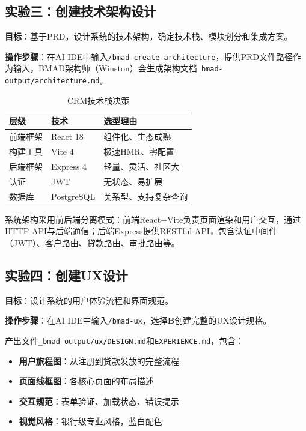\subsection{实验三：创建技术架构设计}

\textbf{目标}：基于PRD，设计系统的技术架构，确定技术栈、模块划分和集成方案。

\textbf{操作步骤}：在AI IDE中输入\texttt{/bmad-create-architecture}，提供PRD文件路径作为输入，BMAD架构师（Winston）会生成架构文档\texttt{\_bmad-output/architecture.md}。

\begin{table}[H]
\centering
\begin{tabular}{lll}
\toprule
\textbf{层级} & \textbf{技术} & \textbf{选型理由} \\
\midrule
前端框架 & React 18 & 组件化、生态成熟 \\
构建工具 & Vite 4 & 极速HMR、零配置 \\
后端框架 & Express 4 & 轻量、灵活、社区大 \\
认证 & JWT & 无状态、易扩展 \\
数据库 & PostgreSQL & 关系型、支持复杂查询 \\
\bottomrule
\end{tabular}
\caption{CRM技术栈决策}
\end{table}

系统架构采用前后端分离模式：前端React+Vite负责页面渲染和用户交互，通过HTTP API与后端通信；后端Express提供RESTful API，包含认证中间件（JWT）、客户路由、贷款路由、审批路由等。

\subsection{实验四：创建UX设计}

\textbf{目标}：设计系统的用户体验流程和界面规范。

\textbf{操作步骤}：在AI IDE中输入\texttt{/bmad-ux}，选择\textbf{B}创建完整的UX设计规格。

产出文件\texttt{\_bmad-output/ux/DESIGN.md}和\texttt{EXPERIENCE.md}，包含：

\begin{itemize}[leftmargin=2em]
  \item \textbf{用户旅程图}：从注册到贷款发放的完整流程
  \item \textbf{页面线框图}：各核心页面的布局描述
  \item \textbf{交互规范}：表单验证、加载状态、错误提示
  \item \textbf{视觉风格}：银行级专业风格，蓝白配色
\end{itemize}

